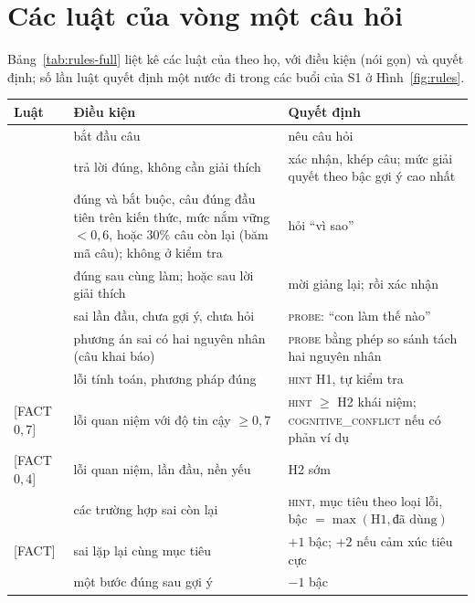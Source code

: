 \section{Các luật của vòng một câu hỏi}\label{app:rules}

Bảng~\ref{tab:rules-full} liệt kê các luật  của  theo họ, với điều kiện (nói gọn) và quyết định; số lần luật quyết định một nước đi trong các buổi của S1 ở Hình~\ref{fig:rules}.

\begin{center}
\label{tab:rules-full}
\footnotesize\renewcommand{\arraystretch}{1.0}
\begin{tabularx}{\linewidth}{@{}>{\raggedright\arraybackslash}p{3.2cm}YY@{}}
\toprule
Luật & Điều kiện & Quyết định \\
\midrule
{} & bắt đầu câu & nêu câu hỏi \\
 & trả lời đúng, không cần giải thích & xác nhận, khép câu; mức giải quyết theo bậc gợi ý cao nhất \\
 & đúng và bắt buộc, câu đúng đầu tiên trên kiến thức, mức nắm vững $<0{,}6$, hoặc $30\%$ câu còn lại (băm mã câu); không ở kiểm tra & hỏi ``vì sao'' \\
 & đúng sau cùng làm; hoặc sau lời giải thích & mời giảng lại; rồi xác nhận \\
 & sai lần đầu, chưa gợi ý, chưa hỏi & \textsc{probe}: ``con làm thế nào'' \\
 & phương án sai có hai nguyên nhân (câu khai báo) & \textsc{probe} bằng phép so sánh tách hai nguyên nhân \\
 & lỗi tính toán, phương pháp đúng & \textsc{hint} H1, tự kiểm tra \\
 [FACT $0{,}7$] & lỗi quan niệm với độ tin cậy $\ge 0{,}7$ & \textsc{hint} $\ge$ H2 khái niệm; \textsc{cognitive\_conflict} nếu có phản ví dụ \\
 [FACT $0{,}4$] & lỗi quan niệm, lần đầu, nền yếu & H2 sớm \\
 & các trường hợp sai còn lại & \textsc{hint}, mục tiêu theo loại lỗi, bậc $=\max(\mathrm{H1},\text{đã dùng})$ \\
 [FACT] & sai lặp lại cùng mục tiêu & $+1$ bậc; $+2$ nếu cảm xúc tiêu cực \\
 & một bước đúng sau gợi ý & $-1$ bậc \\

\end{tabularx}
\end{center}
